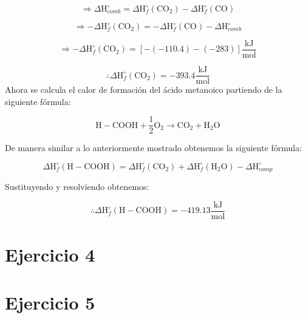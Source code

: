 \documentclass[12pt]{article}
\begin{document}
\begin{displaymath}
	\Rightarrow \Delta\mathrm{H}_{comb}^{\circ}= \Delta\mathrm{H}_f^{\circ}(\mathrm{CO}_2)-\Delta\mathrm{H}_f^{\circ}(\mathrm{CO})
\end{displaymath}

\begin{displaymath}
	\Rightarrow -\Delta\mathrm{H}_f^{\circ}(\mathrm{CO}_2)=-\Delta\mathrm{H}_f^{\circ}(\mathrm{CO})-\Delta\mathrm{H}_{comb}^{\circ}
\end{displaymath}

\begin{displaymath}
	\Rightarrow -\Delta \mathrm{H}_f^{\circ}(\mathrm{CO}_2)=\left[ -(-110.4) - (-283) \right] \frac{\mathrm{kJ}}{\mathrm{mol}}
\end{displaymath}

\begin{displaymath}
	\therefore \Delta\mathrm{H}_f^{\circ}(\mathrm{CO}_2)=-393.4 \frac{\mathrm{kJ}}{\mathrm{mol}}
\end{displaymath}
\newpage
Ahora se calcula el calor de formación del ácido metanoico partiendo de la siguiente fórmula:

\begin{displaymath}
	\mathrm{H}-\mathrm{COOH}+\frac{1}{2}\mathrm{O}_2 \rightarrow \mathrm{CO}_2 + \mathrm{H}_2\mathrm{O}
\end{displaymath}

De manera similar a lo anteriormente mostrado obtenemos la siguiente fórmula:

\begin{displaymath}
	\Delta\mathrm{H}_f^{\circ}(\mathrm{H}-\mathrm{COOH})=\Delta\mathrm{H}_f^{\circ}(\mathrm{CO}_2)+\Delta\mathrm{H}_f^{\circ}(\mathrm{H}_2\mathrm{O})-\Delta\mathrm{H}_{comp}^{\circ}
\end{displaymath}

Sustituyendo y resolviendo obtenemos:

\begin{displaymath}
	\therefore \Delta\mathrm{H}_f^{\circ}(\mathrm{H}-\mathrm{COOH})=-419.13\frac{\mathrm{kJ}}{\mathrm{mol}}
\end{displaymath}
\section*{Ejercicio 4}

\section*{Ejercicio 5}
\end{document}
